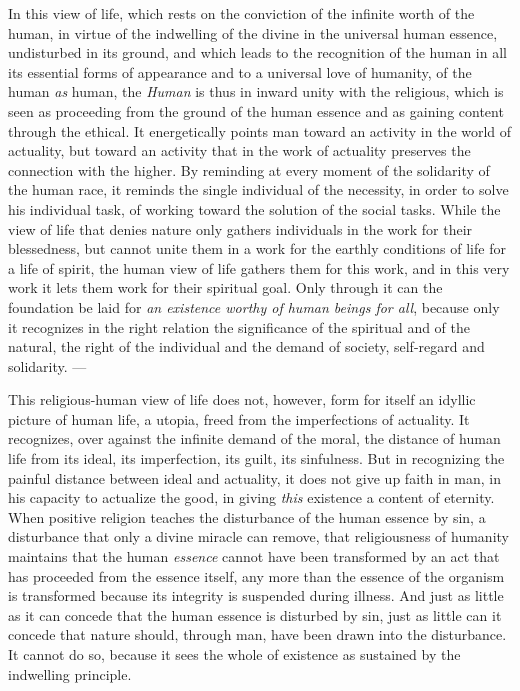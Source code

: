 \documentclass[12pt,a4paper,openany]{book}
\newcommand{\opage}[1]{\marginnote{\footnotesize\textit{[#1]}}}
\begin{document}
In this view of life, which rests on the conviction
of the infinite worth of the human, in virtue of the indwelling of the divine
in the universal human essence, undisturbed in its ground,
and which leads to the recognition of the
human in all its essential forms of appearance and
to a universal love of humanity, of the human
\emph{as} human, the \emph{Human} is thus in inward
unity with the religious, which is seen as proceeding from
the ground of the human essence and as gaining content through
the ethical. It energetically points man toward an activity
in the world of actuality, but toward an activity that
in the work of actuality preserves the connection with the
higher. By reminding at every moment of the solidarity of the
human race, it reminds the single individual of the necessity,
in order to solve his individual task, of working toward the solution
of the social tasks. While the view of life
that denies nature only gathers individuals in the work
for their blessedness, but cannot unite them in a work
for the earthly conditions of life for a life of spirit,
\opage{505}the human view of life gathers them for this work, and in this very
work it lets them work for their spiritual goal. Only
through it can the foundation be laid for \emph{an existence worthy
of human beings for all}, because only it recognizes in the right relation
the significance of the spiritual and of the natural,
the right of the individual and the demand of society, self-regard and
solidarity. ---

This religious-human view of life does not, however, form for itself
an idyllic picture of human life, a utopia, freed from
the imperfections of actuality. It recognizes, over against
the infinite demand of the moral, the distance of human life
from its ideal, its imperfection, its guilt, its
sinfulness. But in recognizing the painful distance
between ideal and actuality, it does not give up faith in
man, in his capacity to actualize the good, in
giving \emph{this} existence a content of eternity. When
positive religion teaches the disturbance of the human essence
by sin, a disturbance that only a divine miracle
can remove, that religiousness of humanity maintains that
the human \emph{essence} cannot have been transformed by an act
that has proceeded from the essence itself, any more than the essence of the organism
is transformed because its integrity is suspended
during illness. And just as little as it can concede
that the human essence is disturbed by sin, just as little can
it concede that nature should, through man, have been drawn
into the disturbance. It cannot do so, because it sees
the whole of existence as sustained by the indwelling principle.
\end{document}
